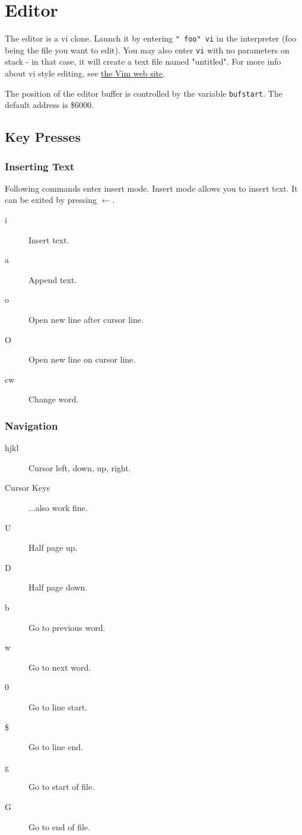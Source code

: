 \chapter{Editor} \label{editor}

The editor is a vi clone. Launch it by entering \texttt{" foo" vi} in the interpreter (foo being
the file you want to edit). You may also enter \texttt{vi} with no parameters on stack - in
that case, it will create a text file named "untitled". For more info about vi style editing, see \href{http://www.vim.org}{the Vim web site}.

The position of the editor buffer is controlled by the variable \texttt{bufstart}. The default address is \$6000.

\section{Key Presses}

\subsection{Inserting Text}
Following commands enter insert mode. Insert mode allows you to insert text. It can be exited by pressing $\leftarrow$.
\begin{description}
\item[i] Insert text.
\item[a] Append text.
\item[o] Open new line after cursor line.
\item[O] Open new line on cursor line.
\item[cw] Change word.
\end{description}

\subsection{Navigation}
\begin{description}
\item[hjkl] Cursor left, down, up, right.
\item[Cursor Keys] ...also work fine.
\item[U] Half page up.
\item[D] Half page down.
\item[b] Go to previous word.
\item[w] Go to next word.
\item[0] Go to line start.
\item[\$] Go to line end.
\item[g] Go to start of file.
\item[G] Go to end of file.
\end{description}


